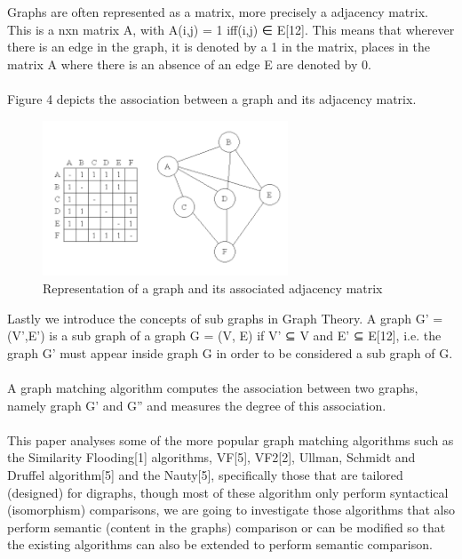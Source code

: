 Graphs are often represented as a matrix, more precisely a adjacency matrix. This is a nxn matrix A, with A(i,j) = 1 iff(i,j) ∈ E[12]. This means that wherever there is an edge in the graph, it is denoted by a 1 in the matrix, places in the matrix A where there is an absence of an edge E are denoted by 0.\\\\
Figure 4 depicts the association between a graph and its adjacency matrix.
\begin{figure}[H]
  \begin{center}
      \includegraphics[width=0.65\textwidth]{matrix.PNG}
  \end{center}    
  \caption{Representation of a graph and its associated adjacency matrix}
\end{figure}

Lastly we introduce the concepts of sub graphs in Graph Theory. A graph G' = (V',E') is a sub graph of a graph G = (V, E) if V' ⊆ V and E' ⊆ E[12], i.e. the graph G' must appear inside graph G in order to be considered a sub graph of G.\\\\

A graph matching algorithm computes the association between two graphs, namely graph G' and G'' and measures the degree of this association.\\\\
 This paper analyses some of the more popular graph matching algorithms such as the Similarity Flooding[1] algorithms, VF[5], VF2[2], Ullman, Schmidt and Druffel algorithm[5] and the Nauty[5], specifically those that are tailored (designed) for digraphs, though most of these algorithm only perform syntactical (isomorphism) comparisons, we are going to investigate those algorithms that also perform semantic (content in the graphs) comparison or can be modified so that the existing algorithms can also be extended to perform semantic comparison.
